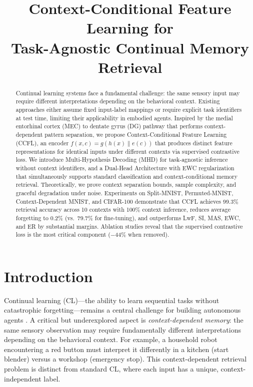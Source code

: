 \documentclass[letterpaper, 10pt, times]{article}
\title{Context-Conditional Feature Learning for\\Task-Agnostic Continual Memory Retrieval}
\author{
\authorblockN{Anonymous}
\authorblockA{Anonymous Institution}
}
\begin{document}
\maketitle

\begin{abstract}
Continual learning systems face a fundamental challenge: the same sensory input may require different interpretations depending on the behavioral context. Existing approaches either assume fixed input-label mappings or require explicit task identifiers at test time, limiting their applicability in embodied agents. Inspired by the medial entorhinal cortex (MEC) to dentate gyrus (DG) pathway that performs context-dependent pattern separation, we propose Context-Conditional Feature Learning (CCFL), an encoder $f(x,c) = g(h(x) \| e(c))$ that produces distinct feature representations for identical inputs under different contexts via supervised contrastive loss. We introduce Multi-Hypothesis Decoding (MHD) for task-agnostic inference without context identifiers, and a Dual-Head Architecture with EWC regularization that simultaneously supports standard classification and context-conditional memory retrieval. Theoretically, we prove context separation bounds, sample complexity, and graceful degradation under noise. Experiments on Split-MNIST, Permuted-MNIST, Context-Dependent MNIST, and CIFAR-100 demonstrate that CCFL achieves 99.3\% retrieval accuracy across 10 contexts with 100\% context inference, reduces average forgetting to 0.2\% (vs.\ 79.7\% for fine-tuning), and outperforms LwF, SI, MAS, EWC, and ER by substantial margins. Ablation studies reveal that the supervised contrastive loss is the most critical component ($-$44\% when removed).
\end{abstract}

\section{Introduction}

Continual learning (CL)---the ability to learn sequential tasks without catastrophic forgetting---remains a central challenge for building autonomous agents \cite{parisi2019continual,de2021continual}. A critical but underexplored aspect is \emph{context-dependent memory}: the same sensory observation may require fundamentally different interpretations depending on the behavioral context. For example, a household robot encountering a red button must interpret it differently in a kitchen (start blender) versus a workshop (emergency stop). This context-dependent retrieval problem is distinct from standard CL, where each input has a unique, context-independent label.
\end{document}
